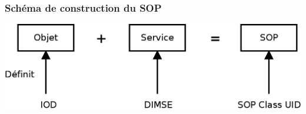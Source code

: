 	\frame
	{
		\frametitle{Sch\'ema de construction du SOP}
		\begin{center}
			\includegraphics[width=\linewidth]{./figures/sop-definition.png}
		\end{center}		
	}
